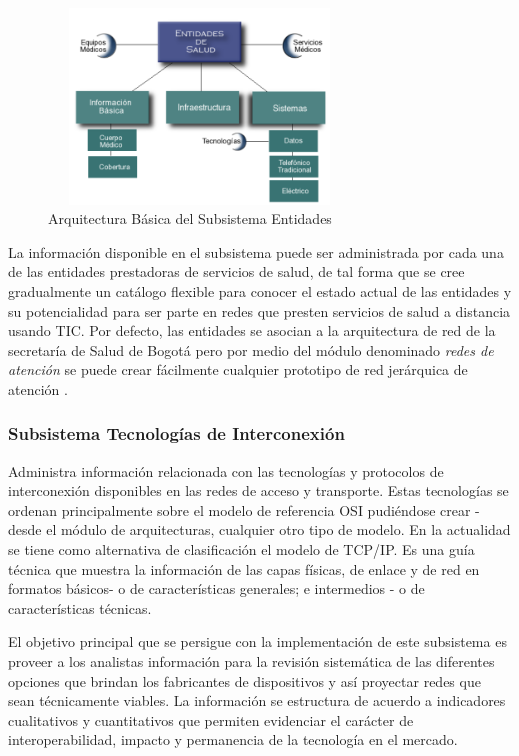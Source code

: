 \begin{figure}
 \centering
 \includegraphics[width=80mm, height=52mm]{entidades.png}
 \caption{Arquitectura Básica del Subsistema Entidades}
\label{entidades}
\end{figure}

La información disponible en el subsistema puede ser administrada por cada una de las entidades prestadoras de servicios de salud, de tal forma que se cree gradualmente un catálogo flexible para conocer el estado actual de las entidades y su potencialidad para ser parte en redes que presten servicios de salud a distancia usando TIC. Por defecto, las entidades se asocian a la arquitectura de red de la secretaría de Salud de Bogotá pero por medio del módulo denominado \textit{redes de atención} se puede crear fácilmente cualquier prototipo de red jerárquica de atención \cite{yellowlees}.

\subsubsection{Subsistema Tecnologías de Interconexión} 
Administra información relacionada con las tecnologías y protocolos de interconexión disponibles en las redes de acceso y transporte. Estas tecnologías se ordenan principalmente sobre el modelo de referencia OSI pudiéndose crear  - desde el módulo de arquitecturas, cualquier otro tipo de modelo. En la actualidad se tiene como alternativa de clasificación el modelo de TCP/IP. Es una guía técnica que muestra la información de las capas físicas, de enlace y de red en formatos básicos- o de características generales; e intermedios - o de características técnicas.

El objetivo principal que se persigue con la implementación de este subsistema es proveer a los analistas información para la revisión sistemática de las diferentes opciones que brindan los fabricantes de dispositivos y así proyectar redes que sean técnicamente viables. La información se estructura de acuerdo a indicadores cualitativos y cuantitativos que permiten evidenciar el carácter de interoperabilidad, impacto y permanencia de la tecnología en el mercado. 

